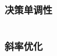 \documentclass[utf8]{ctexart}
\newcommand{\cpp}[1]{\inputminted[linenos,breaklines,tabsize=4,mathescape]{c++}{#1}}
\begin{document}










\subsubsection{决策单调性}
\cpp{codes/dp/decision-monotonicity.cpp}

\subsubsection{斜率优化}
\end{document}
